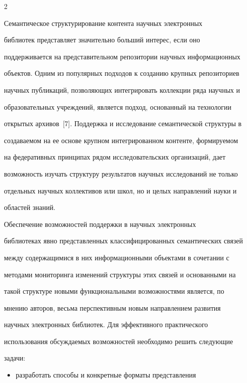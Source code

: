 \begin{multicols}{2}
     


     Семантическое структурирование контента научных электронных 


библиотек представляет значительно больший интерес, если оно 


поддерживается на представительном репозитории научных информационных 


объектов. Одним из популярных подходов к созданию крупных репозиториев 


научных публикаций, позволяющих интегрировать коллекции ряда научных и 


образовательных учреж\-де\-ний, является подход, основанный на технологии 


открытых архивов~[7]. Поддержка и исследование семантической структуры в 


создаваемом на ее основе крупном интегрированном контенте, формируемом 


на федеративных принципах рядом исследовательских организаций, дает 


возможность изучать структуру результатов научных исследований не только 


отдельных научных коллективов или школ, но и целых направлений науки и 


областей знаний. 


     


     Обеспечение возможностей поддержки в научных электронных 


библиотеках явно представленных классифицированных семантических связей 


между содержащимися в них информационными объектами в сочетании с 


методами мониторинга изменений структуры этих связей и основанными на 


такой структуре новыми функциональными возможностями является, по 


мнению авторов, весьма перспективным новым направлением развития 


научных электронных библиотек. Для эффективного практического 


использования обсуждаемых возможностей необходимо решить следующие 


задачи: 


     \begin{itemize}


\item разработать способы и конкретные форматы представления 



\end{itemize}
\end{multicols}
